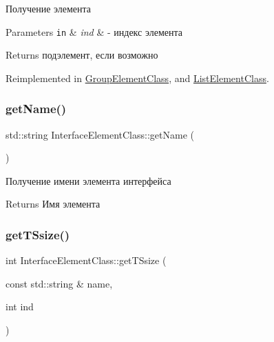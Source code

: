Получение элемента 


\begin{DoxyParams}[1]{Parameters}
\mbox{\tt in}  & {\em ind} & -\/ индекс элемента \\
\hline
\end{DoxyParams}
\begin{DoxyReturn}{Returns}
подэлемент, если возможно 
\end{DoxyReturn}


Reimplemented in \hyperlink{class_group_element_class_ac30e4152465fa8409dfe3bf38e75cce7}{Group\+Element\+Class}, and \hyperlink{class_list_element_class_aaec0cdf8ec3c6a2e9e92cbc33d366b65}{List\+Element\+Class}.

\mbox{\label{class_interface_element_class_a7815b1d9629ff4dc8a83c170dbb171fc}} 
\subsubsection{\texorpdfstring{get\+Name()}{getName()}}
{\footnotesize\ttfamily std\+::string Interface\+Element\+Class\+::get\+Name (\begin{DoxyParamCaption}{ }\end{DoxyParamCaption})}



Получение имени элемента интерфейса 

\begin{DoxyReturn}{Returns}
Имя элемента 
\end{DoxyReturn}
\mbox{\label{class_interface_element_class_ac7b96d7196906f80b377e293cc36404c}} 
\subsubsection{\texorpdfstring{get\+T\+Ssize()}{getTSsize()}}
{\footnotesize\ttfamily int Interface\+Element\+Class\+::get\+T\+Ssize (\begin{DoxyParamCaption}\item[{const std\+::string \&}]{name,  }\item[{int}]{ind }\end{DoxyParamCaption})}

